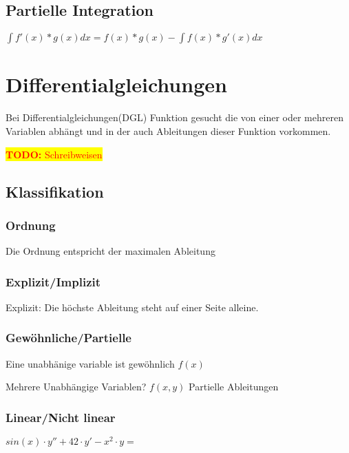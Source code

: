 \documentclass[10pt,a4paper]{article}
\newcommand{\todo}[1]{\begin{flushleft} \colorbox{yellow}{\textcolor{red}{\textbf{TODO:} {#1}}}\end{flushleft} }
\begin{document}
\subsection{Partielle Integration} 


$\int f'(x) * g(x) dx = f(x)*g(x) - \int f(x) * g'(x) dx$




\section{Differentialgleichungen}

Bei Differentialgleichungen(DGL) Funktion gesucht die von einer oder mehreren Variablen abhängt und in der auch Ableitungen dieser Funktion vorkommen.


\todo{Schreibweisen}

\subsection{Klassifikation}


\subsubsection{Ordnung}
	Die Ordnung entspricht der maximalen Ableitung

\subsubsection{Explizit/Implizit}
	Explizit: Die höchste Ableitung steht auf einer Seite alleine.
	
	
\subsubsection{Gewöhnliche/Partielle}
	Eine unabhänige variable ist gewöhnlich
	$f(x)$

	Mehrere Unabhängige Variablen?
	$f(x,y)$
	Partielle Ableitungen
	
	
\subsubsection{Linear/Nicht linear}

	$sin(x) \cdot y'' + 42 \cdot y' - x^2 \cdot y = $
	
\end{document}
